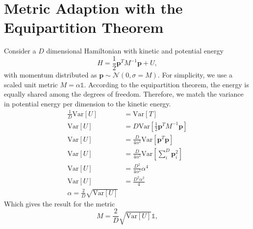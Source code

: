 \documentclass[11pt]{article}
\begin{document}
\section{Metric Adaption with the Equipartition Theorem}\label{sec:metric_derivation}
    Consider a $D$ dimensional Hamiltonian with kinetic and potential energy
    \begin{equation}\label{eq:hamiltonian_appendix}
    H = \frac{1}{2} \mathbf{p}^T M^{-1} \mathbf{p} + U,
    \end{equation}
    with momentum distributed as $\mathbf{p} \sim \mathcal{N}(0, \sigma=M)$.
    For simplicity, we use a scaled unit metric $M = \alpha \mathbb{1}$.
    According to the equipartition theorem, the energy is equally shared among the degrees of freedom.
    Therefore, we match the variance in potential energy per dimension to the kinetic energy.
    \begin{equation}\label{eq:var_matching}
    \begin{aligned}
        \frac{1}{D} \mathrm{Var}[U] &= \mathrm{Var}[T]  \\
        \mathrm{Var}[U] &= D\mathrm{Var}\left[\frac{1}{2} \mathbf{p}^T M^{-1} \mathbf{p}\right]  \\
        \mathrm{Var}[U] &= \frac{D}{4 \alpha^2} \mathrm{Var}\left[\mathbf{p}^T \mathbf{p}\right] \\
        \mathrm{Var}[U] &= \frac{D}{4 \alpha^2} \mathrm{Var}\left[\sum_i^D{\mathbf{p}_i^2}\right] \\
        \mathrm{Var}[U] &= \frac{D^2}{4 \alpha^2} \alpha^4 \\
        \mathrm{Var}[U] &= \frac{D^2 \alpha^2}{4} \\
        \alpha = \frac{2}{D} \sqrt{\mathrm{Var}[U]}
    \end{aligned}
    \end{equation}
    Which gives the result for the metric
    \begin{equation}\label{eq:metric_adaption_appendix}
    M = \frac{2}{D} \sqrt{\mathrm{Var}[U]} \mathbb{1},
    \end{equation}
\end{document}
